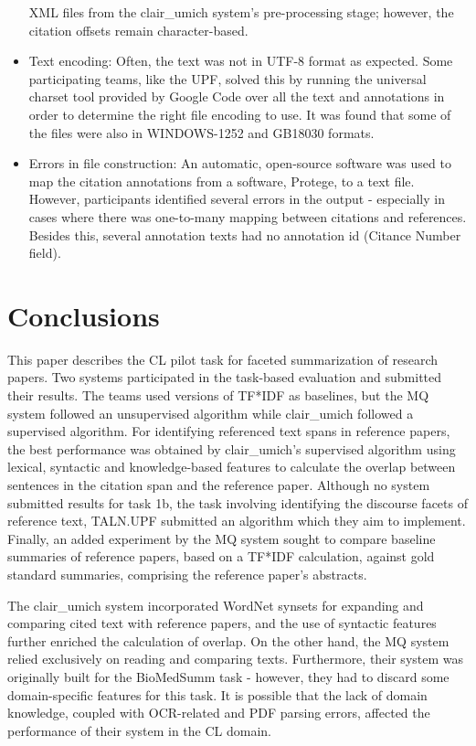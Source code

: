 \documentclass[11pt]{article}
\begin{document}
\begin{itemize}
	XML files from the clair\_umich system's pre-processing stage; however, the 
	citation offsets remain character-based.
\item{Text encoding: Often, the text was not in UTF-8 format as expected}. Some 
	participating teams, like the UPF, solved this by running the universal 	
	charset tool provided by Google Code over all the text and annotations in order 
	to determine the right file encoding to use. It was found that some of the files 
	were also in WINDOWS-1252 and GB18030 formats.
\item{Errors in file construction:} An automatic, open-source software was used 
	to map the citation annotations from a software, Protege, to a text file. 
	However, participants identified several errors in the output -  especially 
	in cases where there was one-to-many mapping between citations and references. 
	Besides this, several annotation texts had no annotation id 
	(Citance Number field). 
\end{itemize}

\section{Conclusions}

This paper describes the CL pilot task for 
faceted summarization of research papers. Two systems participated in the 
task-based evaluation and submitted their results. The teams used versions 
of TF*IDF as baselines, but the MQ system followed an unsupervised algorithm 
while clair\_umich followed a supervised algorithm. For identifying referenced 
text spans in reference papers, the best performance was obtained by 
clair\_umich's supervised algorithm using lexical, syntactic 
and knowledge-based features to calculate the overlap between sentences in 
the citation span and the reference paper. Although no system submitted 
results for task 1b, the task involving identifying the discourse facets of 
reference text, TALN.UPF submitted an algorithm which they aim to implement. 
Finally, an added experiment by the MQ system sought to compare baseline 
summaries of reference papers, based on a TF*IDF calculation, against gold 
standard summaries, comprising the reference paper's abstracts. 
 
The clair\_umich system incorporated WordNet synsets for expanding and 
comparing cited text with reference papers, and the use of syntactic features 
further enriched the calculation of overlap. On the other hand, the MQ system 
relied exclusively on reading and comparing texts. Furthermore, their system 
was originally built for the BioMedSumm task - however, they had to discard 
some domain-specific features for this task. It is possible that the lack of 
domain knowledge, coupled with OCR-related and PDF parsing errors, affected 
the performance of their system in the CL domain.
\end{document}
